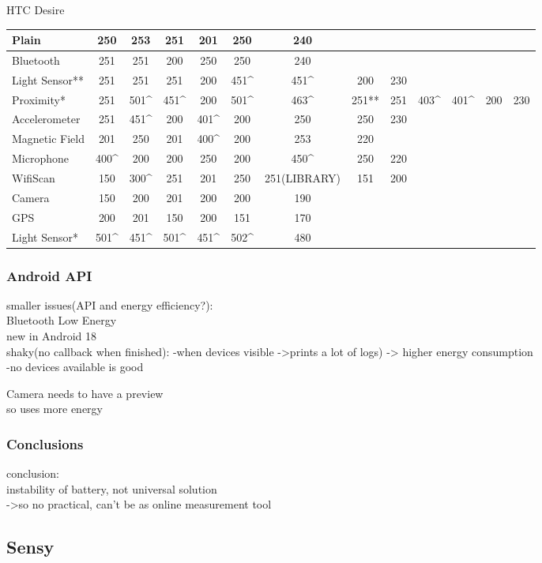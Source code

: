 	HTC Desire\\
	\begin{table}
    \begin{tabular}{| l | c | c | c | c | c | c | c | c | c | c | c | c |}
    \hline
    Plain          & 250  & 253  & 251  & 201  & 250  & 240          & ~     & ~   & ~    & ~    & ~   & ~   \\\hline
    Bluetooth      & 251  & 251  & 200  & 250  & 250  & 240          & ~     & ~   & ~    & ~    & ~   & ~   \\\hline
    Light Sensor** & 251  & 251  & 251  & 200  & 451\^ & 451\^        & 200   & 230 & ~    & ~    & ~   & ~   \\ \hline
    Proximity*     & 251  & 501\^ & 451\^ & 200  & 501\^ & 463\^        & 251** & 251 & 403\^ & 401\^ & 200 & 230 \\ \hline
    Accelerometer  & 251  & 451\^ & 200  & 401\^ & 200  & 250          & 250   & 230 & ~    & ~    & ~   & ~   \\ \hline
    Magnetic Field & 201  & 250  & 201  & 400\^ & 200  & 253          & 220   & ~   & ~    & ~    & ~   & ~   \\ \hline
    Microphone     & 400\^ & 200  & 200  & 250  & 200  & 450\^        & 250   & 220 & ~    & ~    & ~   & ~   \\ \hline
    WifiScan       & 150  & 300\^ & 251  & 201  & 250  & 251(LIBRARY) & 151   & 200 & ~    & ~    & ~   & ~   \\ \hline
    Camera         & 150  & 200  & 201  & 200  & 200  & 190          & ~     & ~   & ~    & ~    & ~   & ~   \\ \hline
    GPS            & 200  & 201  & 150  & 200  & 151  & 170          & ~     & ~   & ~    & ~    & ~   & ~   \\ \hline
    Light Sensor*  & 501\^ & 451\^ & 501\^ & 451\^ & 502\^ & 480          & ~     & ~   & ~    & ~    & ~   & ~   \\ \hline
    \end{tabular}
\end{table}

\subsubsection{Android API}
smaller issues(API and energy efficiency?):\\
	Bluetooth Low Energy\\
		new in Android 18\\
		shaky(no callback when finished):
			-when devices visible ->prints a lot of logs) -> higher energy consumption\\
			-no devices available is good
		
	Camera needs to have a preview\\
		so uses more energy\\
   
   
\subsubsection{Conclusions}   
conclusion:\\
	instability of battery, not universal solution\\
		->so no practical, can't be as online measurement tool\\

\subsection{Sensy}